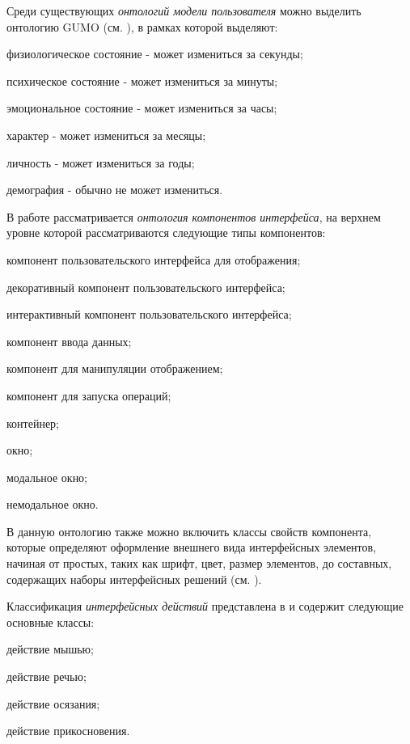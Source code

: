 Среди существующих \textit{онтологий модели пользователя} можно выделить онтологию GUMO (см. ), в рамках которой выделяют:
\begin{textitemize}
	\item физиологическое состояние - может измениться за секунды;
	\item психическое состояние - может измениться за минуты;
	\item эмоциональное состояние - может измениться за часы;
	\item характер - может измениться за месяцы;
	\item личность - может измениться за годы;
	\item демография - обычно не может измениться.
\end{textitemize}

В работе  рассматривается \textit{онтология компонентов интерфейса}, на верхнем уровне которой рассматриваются следующие типы компонентов:
\begin{textitemize}
	\item компонент пользовательского интерфейса для отображения;
	\item декоративный компонент пользовательского интерфейса;
	\item интерактивный компонент пользовательского интерфейса;
	\item компонент ввода данных;
	\item компонент для манипуляции отображением;
	\item компонент для запуска операций;
	\item контейнер;
	\item окно;
	\item модальное окно;
	\item немодальное окно.
\end{textitemize}

В данную онтологию также можно включить классы свойств компонента, которые определяют оформление внешнего вида интерфейсных элементов, начиная от простых, таких как шрифт, цвет, размер элементов, до составных, содержащих наборы интерфейсных решений (см. \cite{gribova_2022}).

Классификация \textit{интерфейсных действий} представлена в  и содержит следующие основные классы:
\begin{textitemize}
	\item действие мышью;
	\item действие речью;
	\item действие осязания;
	\item действие прикосновения.
\end{textitemize}


